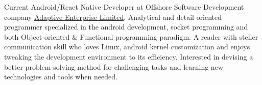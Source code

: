 

\begin{cvparagraph}

Current Android/React Native Developer at Offshore Software Development company {\href{http://ael-bd.com}{Adaptive Enterprise Limited}}. 
Analytical and detail oriented programmer specialized in the android development, socket programming and both Object-oriented \& Functional programming paradigm. 
A reader with steller communication skill who loves Linux, android kernel customization and enjoys tweaking the development environment to its efficiency. 
Interested in devising a better problem-solving method for challenging tasks and learning new technologies and tools when needed.
\end{cvparagraph}
